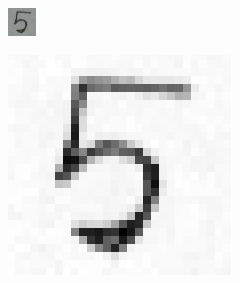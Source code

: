 \begin{frame}[plain]
\begin{figure}
\begin{subfigure}{0.2\textwidth}
\end{subfigure}\hspace{0.75cm}
\begin{subfigure}{0.2\textwidth}
\includegraphics[width = \textwidth]{todd_five}
\end{subfigure}
\begin{subfigure}{0.2\textwidth}
\includegraphics[width = \textwidth]{clean_five}
\end{subfigure}
\end{figure}



\end{frame}
